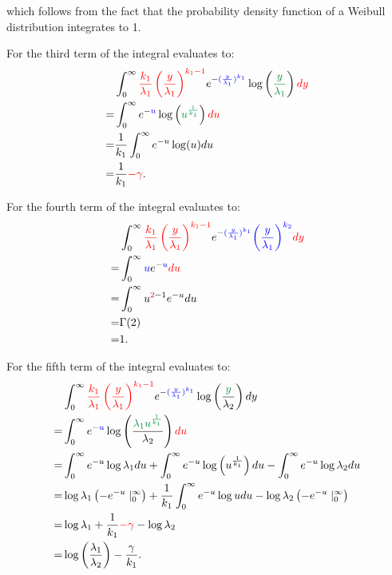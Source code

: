 which follows from the fact that the probability density function of a Weibull distribution integrates to 1. 

For the third term of the integral evaluates to:
\begin{align*}
&\int_{0}^{\infty}\textcolor{red}{\frac{k_1}{\lambda_1} \left(\frac{y}{\lambda_1}\right)^{k_1-1}} e^{-\textcolor{blue}{(\frac{y}{\lambda_1})^{k_1}}}\log\left(\textcolor{PowerPointGreen}{\frac{y}{\lambda_1}}\right) \textcolor{red}{dy}\\
=&\int_{0}^{\infty}e^{-\textcolor{blue}{u}}\log\left(\textcolor{PowerPointGreen}{u^{\frac{1}{k_1}}}\right)\textcolor{red}{du}\\
=&\frac{1}{k_1}\int_{0}^{\infty}e^{-u}\log (u)du\\
=&\frac{1}{k_1}\textcolor{red}{-\gamma}.
\end{align*}

For the fourth term of the integral evaluates to:
\begin{align*}
&\int_{0}^{\infty}\textcolor{red}{\frac{k_1}{\lambda_1} \left(\frac{y}{\lambda_1}\right)^{k_1-1}} e^{-\textcolor{blue}{(\frac{y}{\lambda_1})^{k_1}}}\textcolor{blue}{\left(\frac{y}{\lambda_1}\right)^{k_2}} \textcolor{red}{dy}\\
=&\int_{0}^{\infty}\textcolor{blue}{u}e^{-\textcolor{blue}{u}}\textcolor{red}{du}\\
=&\int_{0}^{\infty}u^{\textcolor{red}{2}-1}e^{-u}du\\
=&\Gamma(2)\\
=&1.
\end{align*}

For the fifth term of the integral evaluates to:
\begin{align*}
&\int_{0}^{\infty}\textcolor{red}{\frac{k_1}{\lambda_1} \left(\frac{y}{\lambda_1}\right)^{k_1-1}} e^{-\textcolor{blue}{(\frac{y}{\lambda_1})^{k_1}}}\log\left(\frac{\textcolor{PowerPointGreen}{y}}{\lambda_2}\right) dy\\
=&\int_{0}^{\infty}e^{-\textcolor{blue}{u}}\log \left(\frac{\textcolor{PowerPointGreen}{\lambda_1u^{\frac{1}{k_1}}}}{\lambda_2}\right)\textcolor{red}{du}\\
=&\int_{0}^{\infty}e^{-u}\log \lambda_1du+\int_{0}^{\infty}e^{-u}\log \left(u^{\frac{1}{k_1}}\right)du-\int_{0}^{\infty}e^{-u}\log \lambda_2du\\
=&\log \lambda_1\left(-e^{-u}\mid^\infty_0\right)+\frac{1}{k_1}\int_{0}^{\infty}e^{-u}\log u du-\log \lambda_2\left(-e^{-u}\mid^\infty_0\right)\\
=&\log \lambda_1+\frac{1}{k_1}\textcolor{red}{-\gamma}-\log \lambda_2\\
=&\log\left(\frac{\lambda_1}{\lambda_2}\right)-\frac{\gamma}{k_1}.
\end{align*}

